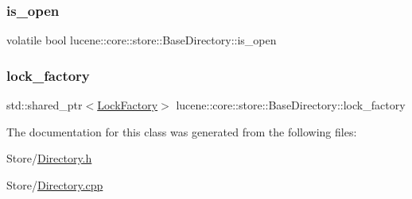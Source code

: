 \subsubsection{\texorpdfstring{is\+\_\+open}{is\_open}}
{\footnotesize\ttfamily volatile bool lucene\+::core\+::store\+::\+Base\+Directory\+::is\+\_\+open\hspace{0.3cm}{\ttfamily [protected]}}

\mbox{\label{classlucene_1_1core_1_1store_1_1BaseDirectory_a61e759bb8ca8ec591d2a067679164f3a}} 
\subsubsection{\texorpdfstring{lock\+\_\+factory}{lock\_factory}}
{\footnotesize\ttfamily std\+::shared\+\_\+ptr$<$\mbox{\hyperlink{classlucene_1_1core_1_1store_1_1LockFactory}{Lock\+Factory}}$>$ lucene\+::core\+::store\+::\+Base\+Directory\+::lock\+\_\+factory\hspace{0.3cm}{\ttfamily [protected]}}



The documentation for this class was generated from the following files\+:\begin{DoxyCompactItemize}
\item 
Store/\mbox{\hyperlink{Directory_8h}{Directory.\+h}}\item 
Store/\mbox{\hyperlink{Directory_8cpp}{Directory.\+cpp}}\end{DoxyCompactItemize}
